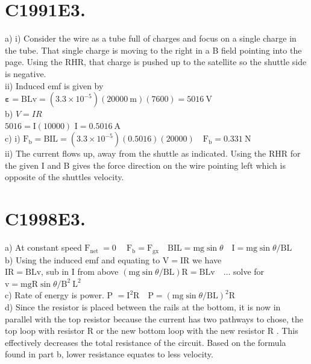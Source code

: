 \begin{enumerate}
\section*{C1991E3.}
a) i) Consider the wire as a tube full of charges and focus on a single charge in the tube. That single charge is moving to the right in a B field pointing into the page. Using the RHR, that charge is pushed up to the satellite so the shuttle side is negative.\\
ii) Induced emf is given by $\boldsymbol{\varepsilon}=\mathrm{BLv}=\left(3.3 \times 10^{-5}\right)(20000 \mathrm{~m})(7600)=5016 \mathrm{~V}$\\
b) $V=I R$\\
$5016=\mathrm{I}(10000)$ $\mathrm{I}=0.5016 \mathrm{~A}$\\
c) i) $\mathrm{F}_{\mathrm{b}}=\mathrm{BIL}=\left(3.3 \times 10^{-5}\right)(0.5016)(20000) \quad \mathrm{F}_{\mathrm{b}}=0.331 \mathrm{~N}$\\
ii) The current flows up, away from the shuttle as indicated. Using the RHR for the given I and B gives the force direction on the wire pointing left which is opposite of the shuttles velocity.

\section*{C1998E3.}
a) At constant speed $\mathrm{F}_{\text {net }}=0 \quad \mathrm{~F}_{\mathrm{b}}=\mathrm{F}_{\mathrm{gx}} \quad \mathrm{BIL}=\mathrm{mg} \sin \theta \quad \mathrm{I}=\mathrm{mg} \sin \theta / \mathrm{BL}$\\
b) Using the induced emf and equating to $\mathrm{V}=\mathrm{IR}$ we have\\
$\mathrm{IR}=\mathrm{BLv}$, sub in I from above $(\mathrm{mg} \sin \theta / \mathrm{BL}) \mathrm{R}=\mathrm{BLv} \quad \ldots$ solve for $\mathrm{v}=\mathrm{mgR} \sin \theta / \mathrm{B}^{2} \mathrm{~L}^{2}$\\
c) Rate of energy is power. P $=\mathrm{I}^{2} \mathrm{R} \quad \mathrm{P}=(\mathrm{mg} \sin \theta / \mathrm{BL})^{2} \mathrm{R}$\\
d) Since the resistor is placed between the rails at the bottom, it is now in parallel with the top resistor because the current has two pathways to chose, the top loop with resistor R or the new bottom loop with the new resistor R . This effectively decreases the total resistance of the circuit. Based on the formula found in part b, lower resistance equates to less velocity.


\end{enumerate}
